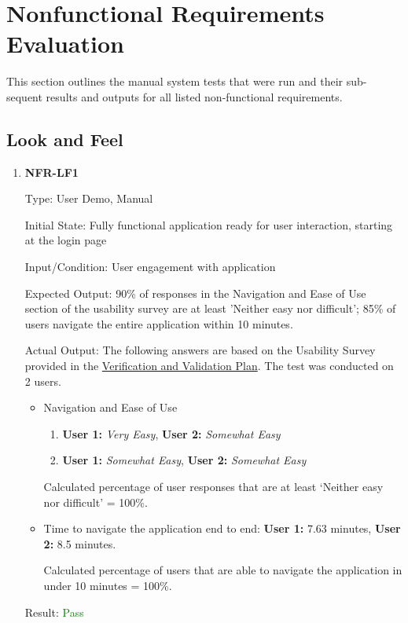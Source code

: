 \documentclass[12pt, titlepage]{article}
\begin{document}
\section{Nonfunctional Requirements Evaluation}
This section outlines the manual system tests that were run and their sub-
sequent results and outputs for all listed non-functional requirements.
\subsection{Look and Feel} \label{NFR-LF}
\begin{enumerate}
\item{\textbf{NFR-LF1}} \label{NFR:LF1}

Type: User Demo, Manual

Initial State: Fully functional application ready for user interaction, starting
at the login page

Input/Condition: User engagement with application

Expected Output: 90\% of responses in the Navigation and Ease of Use section of
the usability survey are at least 'Neither easy nor difficult'; 85\% of users
navigate the entire application within 10 minutes.

Actual Output: \newline
The following answers are based on the Usability Survey provided in the
\href{https://github.com/SumanyaG/Alkalytics/blob/main/docs/VnVPlan/VnVPlan.pdf}
{Verification and Validation Plan}. The test was conducted on 2 users.
\begin{itemize}
  \item Navigation and Ease of Use
  \begin{enumerate}
    \item \textbf{User 1:} \emph{Very Easy}, \textbf{User 2:} \emph{Somewhat
    Easy}
    \item \textbf{User 1:} \emph{Somewhat Easy}, \textbf{User 2:} \emph{Somewhat
    Easy}
  \end{enumerate}
  Calculated percentage of user responses that are at least `Neither easy nor
  difficult' = 100\%.
  \item Time to navigate the application end to end: \textbf{User 1:} 7.63
  minutes, \textbf{User 2:} 8.5 minutes.
  
  Calculated percentage of users that are able to navigate the application in
  under 10 minutes = 100\%.
\end{itemize}

Result: \textcolor{green}{Pass}


\end{enumerate}
\end{document}
